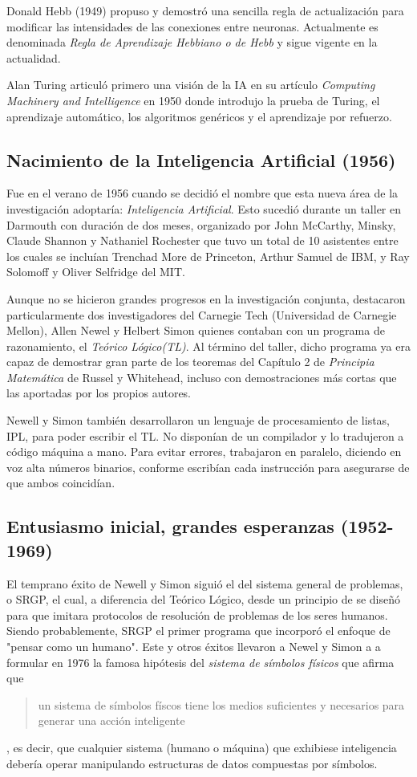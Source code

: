 \documentclass[12pt,a4paper]{article}
\begin{document}
Donald Hebb (1949) propuso y demostró una sencilla regla de actualización para modificar las intensidades de las conexiones entre neuronas. Actualmente es denominada \emph{Regla de Aprendizaje Hebbiano o de Hebb} y sigue vigente en la actualidad.

Alan Turing articuló primero una visión de la IA en su artículo \emph{Computing Machinery and Intelligence}\cite{Turing} en 1950 donde introdujo la prueba de Turing, el aprendizaje automático, los algoritmos genéricos y el aprendizaje por refuerzo.

\subsection{Nacimiento de la Inteligencia Artificial (1956)}
Fue en el verano de 1956 cuando se decidió el nombre que esta nueva área de la investigación adoptaría: \emph{Inteligencia Artificial}. Esto sucedió durante un taller en Darmouth con duración de dos meses, organizado por John McCarthy, Minsky, Claude Shannon y Nathaniel Rochester que tuvo un total de 10 asistentes entre los cuales se incluían Trenchad More de Princeton, Arthur Samuel de IBM, y Ray Solomoff y Oliver Selfridge del MIT.

Aunque no se hicieron grandes progresos en la investigación conjunta, destacaron particularmente dos investigadores del Carnegie Tech (Universidad de Carnegie Mellon), Allen Newel y Helbert Simon quienes contaban con un programa de razonamiento, el \emph{Teórico Lógico(TL)}. Al término del taller, dicho programa ya era capaz de demostrar gran parte de los teoremas del Capítulo 2 de \emph{Principia Matemática} de Russel y Whitehead, incluso con demostraciones más cortas que las aportadas por los propios autores.

Newell y Simon también desarrollaron un lenguaje de procesamiento de listas, IPL, para poder escribir el TL. No disponían de un compilador y lo tradujeron a código máquina a mano. Para evitar errores, trabajaron en paralelo, diciendo en voz alta números binarios, conforme escribían cada instrucción para asegurarse de que ambos coincidían.

\subsection{Entusiasmo inicial, grandes esperanzas (1952-1969)}
El temprano éxito de Newell y Simon siguió el del sistema general de problemas, o SRGP, el cual, a diferencia del Teórico Lógico, desde un principio de se diseñó para que imitara protocolos de resolución de problemas de los seres humanos. Siendo probablemente, SRGP el primer programa que incorporó el enfoque de "pensar como un humano". Este y otros éxitos llevaron a Newel y Simon a a formular en 1976 la famosa hipótesis del \emph{sistema de símbolos físicos} que afirma que \begin{quote}\small un sistema de símbolos físcos tiene los medios suficientes y necesarios para generar una acción inteligente\end{quote}, es decir, que cualquier sistema (humano o máquina) que exhibiese inteligencia debería operar manipulando estructuras de datos compuestas por símbolos.
\end{document}
